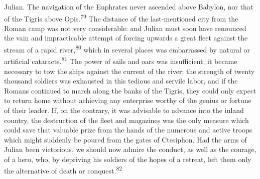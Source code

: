 Julian. The navigation of the Euphrates never ascended above
Babylon, nor that of the Tigris above Opis.\textsuperscript{79} The distance of
the last-mentioned city from the Roman camp was not very
considerable: and Julian must soon have renounced the vain and
impracticable attempt of forcing upwards a great fleet against
the stream of a rapid river,\textsuperscript{80} which in several places was
embarrassed by natural or artificial cataracts.\textsuperscript{81} The power of
sails and oars was insufficient; it became necessary to tow the
ships against the current of the river; the strength of twenty
thousand soldiers was exhausted in this tedious and servile
labor, and if the Romans continued to march along the banks of
the Tigris, they could only expect to return home without
achieving any enterprise worthy of the genius or fortune of their
leader. If, on the contrary, it was advisable to advance into the
inland country, the destruction of the fleet and magazines was
the only measure which could save that valuable prize from the
hands of the numerous and active troops which might suddenly be
poured from the gates of Ctesiphon. Had the arms of Julian been
victorious, we should now admire the conduct, as well as the
courage, of a hero, who, by depriving his soldiers of the hopes
of a retreat, left them only the alternative of death or
conquest.\textsuperscript{82}





